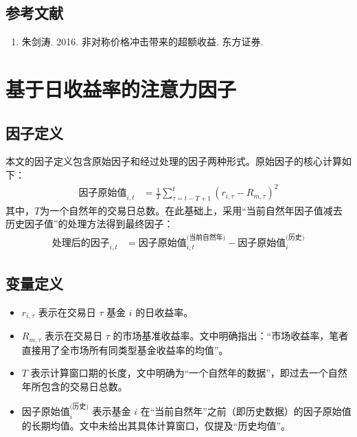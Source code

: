\documentclass{article}
\begin{document}
\subsection{参考文献}
\begin{enumerate}
    \item 朱剑涛. 2016. 非对称价格冲击带来的超额收益. 东方证券.
\end{enumerate}

\section{基于日收益率的注意力因子}

\subsection{因子定义}
本文的因子定义包含原始因子和经过处理的因子两种形式。原始因子的核心计算如下：
\begin{equation}
\begin{aligned}
\text{因子原始值}_{i, t} &= \frac{1}{T} \sum_{\tau = t-T+1}^{t} (r_{i, \tau} - R_{m, \tau})^2
\end{aligned}
\end{equation}
\vspace{6pt}
其中，$T$为一个自然年的交易日总数。在此基础上，采用“当前自然年因子值减去历史因子值”的处理方法得到最终因子：
\begin{equation}
\begin{aligned}
\text{处理后的因子}_{i, t} &= \text{因子原始值}_{i, t}^{\text{(当前自然年)}} - \text{因子原始值}_{i}^{\text{(历史)}}
\end{aligned}
\end{equation}

\subsection{变量定义}
\begin{itemize}
    \item $r_{i, \tau}$ 表示在交易日 $\tau$ 基金 $i$ 的日收益率。
    \item $R_{m, \tau}$ 表示在交易日 $\tau$ 的市场基准收益率。文中明确指出：“市场收益率，笔者直接用了全市场所有同类型基金收益率的均值”。
    \item $T$ 表示计算窗口期的长度，文中明确为“一个自然年的数据”，即过去一个自然年所包含的交易日总数。
    \item $\text{因子原始值}_{i}^{\text{(历史)}}$ 表示基金 $i$ 在“当前自然年”之前（即历史数据）的因子原始值的长期均值。文中未给出其具体计算窗口，仅提及“历史均值”。
\end{itemize}
\end{document}

